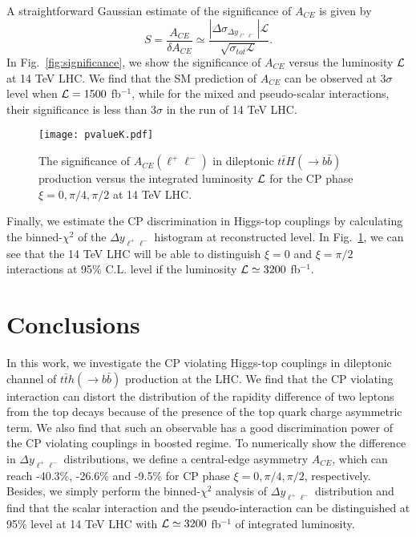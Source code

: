 \documentclass[twocolumn,prd,noshowpacs,nofootinbib,amsmath,amssymb,superscriptaddress,preprintnumbers]{revtex4}
\begin{document}
A straightforward Gaussian estimate of the significance of $A_{CE}$ is given by
\begin{equation}
  S=\frac{A_{CE}}{\delta A_{CE}} \simeq \frac{|\Delta\sigma_{\Delta y_{\ell^+\ell^-}}|\mathcal{L}}{\sqrt{\sigma_{tot}\mathcal{L}}}.
\end{equation}
In Fig.~\ref{fig:significance}, we show the significance of $A_{CE}$ versus the luminosity $\cal L$ at 14 TeV LHC. We find that the SM prediction of $A_{CE}$ can be observed at $3\sigma$ level when ${\cal L}=1500$ fb$^{-1}$, while for the mixed and pseudo-scalar interactions, their significance is less than $3\sigma$ in the run of 14 TeV LHC.


\begin{figure}[ht!]
\centering
\texttt{[image: pvalueK.pdf]}
\caption{The significance of $A_{CE}(\ell^+\ell^-)$ in dileptonic $t\bar{t}H(\to b\bar{b})$ production versus the integrated luminosity ${\cal L}$ for the CP phase $\xi=0,\pi/4,\pi/2$ at 14 TeV LHC.}
\label{fig:pvalue}
\end{figure}
Finally, we estimate the CP discrimination in Higgs-top couplings by calculating the binned-$\chi^2$ of the $\Delta y_{\ell^+\ell^-}$ histogram at reconstructed level. In Fig.~\ref{fig:pvalue}, we can see that the 14 TeV LHC will be able to distinguish $\xi=0$ and $\xi=\pi/2$ interactions at 95\% C.L. level if the luminosity ${\cal L} \simeq 3200$ fb$^{-1}$.


\section{Conclusions}
In this work, we investigate the CP violating Higgs-top couplings in dileptonic channel of $t\bar{t}h(\to b\bar{b})$ production at the LHC. We find that the CP violating interaction can distort the distribution of the rapidity difference of two leptons from the top decays because of the presence of the top quark charge asymmetric term. We also find that such an observable has a good discrimination power of the CP violating couplings in boosted regime. To numerically show the difference in $\Delta y_{\ell^+\ell^-}$ distributions, we define a central-edge asymmetry $A_{CE}$, which can reach -40.3\%, -26.6\% and -9.5\% for CP phase $\xi=0,\pi/4,\pi/2$, respectively. Besides, we simply perform the binned-$\chi^2$ analysis of $\Delta y_{\ell^+\ell^-}$ distribution and find that the scalar interaction and the pseudo-interaction can be distinguished at 95\% level at 14 TeV LHC with ${\cal L}\simeq 3200$ fb$^{-1}$ of integrated luminosity.
\end{document}
